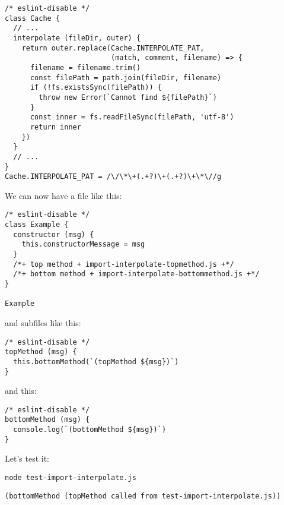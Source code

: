 \documentclass[krantzl]{krantz}
\begin{document}
\begin{lstlisting}[frame=single,frameround=tttt]
/* eslint-disable */
class Cache {
  // ...
  interpolate (fileDir, outer) {
    return outer.replace(Cache.INTERPOLATE_PAT,
                         (match, comment, filename) => {
      filename = filename.trim()
      const filePath = path.join(fileDir, filename)
      if (!fs.existsSync(filePath)) {
        throw new Error(`Cannot find ${filePath}`)
      }
      const inner = fs.readFileSync(filePath, 'utf-8')
      return inner
    })
  }
  // ...
}
Cache.INTERPOLATE_PAT = /\/\*\+(.+?)\+(.+?)\+\*\//g
\end{lstlisting}



We can now have a file like this:


\begin{lstlisting}[frame=single,frameround=tttt]
/* eslint-disable */
class Example {
  constructor (msg) {
    this.constructorMessage = msg
  }
  /*+ top method + import-interpolate-topmethod.js +*/
  /*+ bottom method + import-interpolate-bottommethod.js +*/
}

Example
\end{lstlisting}



\noindent and subfiles like this:


\begin{lstlisting}[frame=single,frameround=tttt]
/* eslint-disable */
topMethod (msg) {
  this.bottomMethod(`(topMethod ${msg})`)
}
\end{lstlisting}



\noindent and this:


\begin{lstlisting}[frame=single,frameround=tttt]
/* eslint-disable */
bottomMethod (msg) {
  console.log(`(bottomMethod ${msg})`)
}
\end{lstlisting}



Let's test it:


\begin{lstlisting}[frame=single,frameround=tttt]
node test-import-interpolate.js
\end{lstlisting}



\begin{lstlisting}[frame=single,frameround=tttt]
(bottomMethod (topMethod called from test-import-interpolate.js))
\end{lstlisting}
\end{document}
